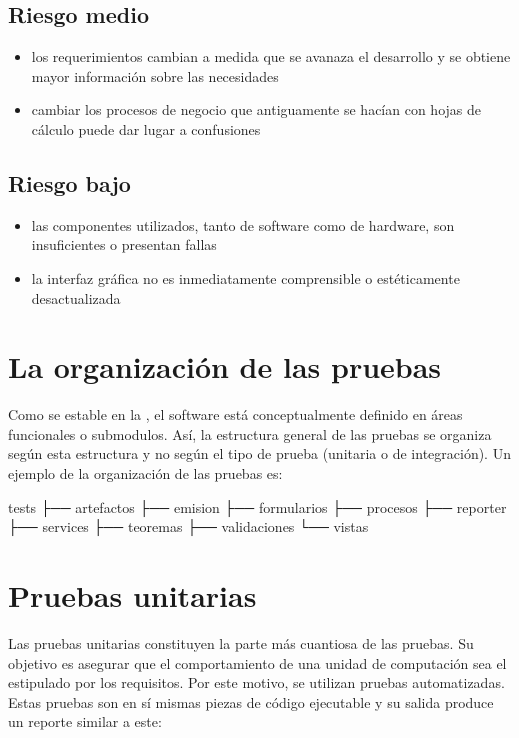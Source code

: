 \documentclass[letterpaper,10pt,spanish]{sphinxmanual}
\begin{document}
\subsection{Riesgo medio}
\label{\detokenize{requerimientos/STPD:riesgo-medio}}\begin{itemize}
\item {} 
los requerimientos cambian a medida que se avanaza el desarrollo y se obtiene mayor información sobre las necesidades

\item {} 
cambiar los procesos de negocio que antiguamente se hacían con hojas de cálculo puede dar lugar a confusiones

\end{itemize}


\subsection{Riesgo bajo}
\label{\detokenize{requerimientos/STPD:riesgo-bajo}}\begin{itemize}
\item {} 
las componentes utilizados, tanto de software como de hardware,  son insuficientes o presentan fallas

\item {} 
la interfaz gráfica no es inmediatamente comprensible o estéticamente desactualizada

\end{itemize}


\section{La organización de las pruebas}
\label{\detokenize{requerimientos/STPD:la-organizacion-de-las-pruebas}}
Como se estable en la , el
software está conceptualmente definido en áreas funcionales
o submodulos. Así, la estructura general de las pruebas
se organiza según esta estructura y no según el tipo
de prueba (unitaria o de integración). Un ejemplo
de la organización de las pruebas es:

\begin{sphinxVerbatim}[commandchars=\\\{\}]
tests
├── artefactos
├── emision
├── formularios
├── procesos
├── reporter
├── services
├── teoremas
├── validaciones
└── vistas
\end{sphinxVerbatim}


\section{Pruebas unitarias}
\label{\detokenize{requerimientos/STPD:pruebas-unitarias}}
Las pruebas unitarias constituyen la parte más cuantiosa de las pruebas.
Su objetivo es asegurar que el comportamiento de una unidad de computación
sea el estipulado por los requisitos. Por este motivo, se utilizan
pruebas automatizadas. Estas pruebas son en sí mismas piezas de código
ejecutable y su salida produce un reporte similar a este:
\end{document}
